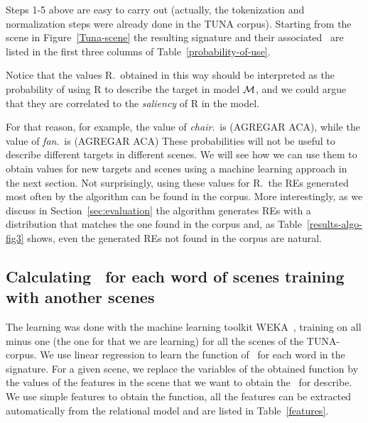 Steps 1-5 above are easy to carry out (actually, the tokenization and normalization steps were already done in the TUNA corpus). 
Starting from the scene in Figure~\ref{Tuna-scene}
the resulting signature and their associated \puse\ are listed in the first three columns of Table~\ref{probability-of-use}. 

Notice that the values R.\puse\ obtained in this way should be interpreted as the probability of using R to describe the target in model 
$\mathcal{M}$, and we could argue that they are correlated to the \emph{saliency} of R in the model.  

For that reason, for example, the value of \emph{chair}.\puse\ is (AGREGAR ACA), while the value of \emph{fan}.\puse\ is (AGREGAR ACA)  
These probabilities will not be useful to describe different targets in different scenes. We will see how we can use them to obtain
 values for new targets and scenes using a machine learning approach in the next section. Not surprisingly, using these values for 
R.\puse\ the REs generated most often by the algorithm can be found in the corpus. More interestingly, as we discuss in 
Section~\ref{sec:evaluation} the algorithm generates REs with a distribution that matches the one found in the corpus and, 
as Table~\ref{results-algo-fig3} shows, even the generated REs not found in the corpus are natural.    


\subsection{Calculating \puse\ for each word of scenes training with another scenes} \label{subsec:learning}

The learning was done with the machine learning toolkit WEKA~\cite{Hall:WEK09}, training on all minus one (the one for that we are learning) for all the scenes of the TUNA-corpus. We use linear regression to learn the function of \puse\ for each word in the signature. 
For a given scene, we replace the variables of the obtained function by the values of the features in the scene that we want to obtain the \puse\ for describe. 
We use simple features to obtain the function, all the features can be extracted automatically from the relational model and are listed 
in Table~\ref{features}.  

